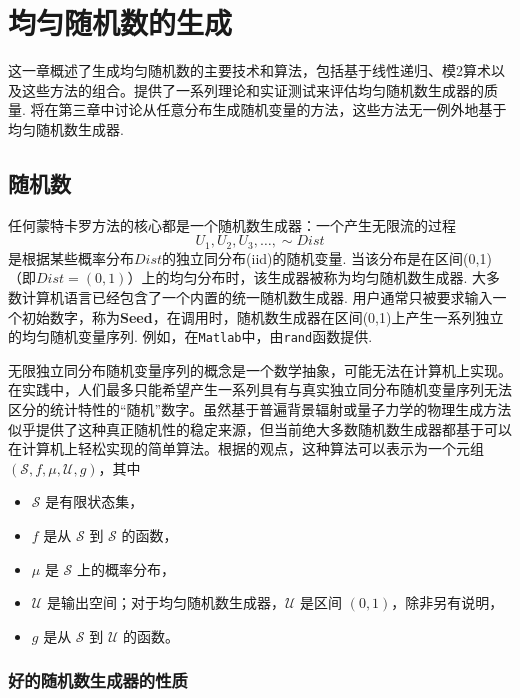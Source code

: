 \chapter{均匀随机数的生成}
这一章概述了生成均匀随机数的主要技术和算法，包括基于线性递归、模2算术以及这些方法的组合。提供了一系列理论和实证测试来评估均匀随机数生成器的质量. 将在第三章中讨论从任意分布生成随机变量的方法，这些方法无一例外地基于均匀随机数生成器.
\section{随机数}
任何蒙特卡罗方法的核心都是一个随机数生成器：一个产生无限流的过程
$$U_1,U_2,U_3,\dots,\sim Dist$$
是根据某些概率分布$Dist$的独立同分布(iid)的随机变量. 当该分布是在区间(0,1)（即$Dist = (0,1)$）上的均匀分布时，该生成器被称为均匀随机数生成器. 大多数计算机语言已经包含了一个内置的统一随机数生成器. 用户通常只被要求输入一个初始数字，称为\textbf{Seed}，在调用时，随机数生成器在区间(0,1)上产生一系列独立的均匀随机变量序列. 例如，在\texttt{Matlab}中，由\texttt{rand}函数提供.

无限独立同分布随机变量序列的概念是一个数学抽象，可能无法在计算机上实现。在实践中，人们最多只能希望产生一系列具有与真实独立同分布随机变量序列无法区分的统计特性的“随机”数字。虽然基于普遍背景辐射或量子力学的物理生成方法似乎提供了这种真正随机性的稳定来源，但当前绝大多数随机数生成器都基于可以在计算机上轻松实现的简单算法。根据\citet{l1994uniform}的观点，这种算法可以表示为一个元组 $(\mathcal{S}, f, \mu, \mathcal{U}, g)$，其中
\begin{itemize}
	\item $\mathcal{S}$ 是有限状态集，
	\item $f$ 是从 $\mathcal{S}$ 到 $\mathcal{S}$ 的函数，
	\item $\mu$ 是 $\mathcal{S}$ 上的概率分布，
	\item $\mathcal{U}$ 是输出空间；对于均匀随机数生成器，$\mathcal{U}$ 是区间 $(0,1)$，除非另有说明，
	\item $g$ 是从 $\mathcal{S}$ 到 $\mathcal{U}$ 的函数。
\end{itemize}


\subsection{好的随机数生成器的性质}


\renewcommand{\bibname}{References}

